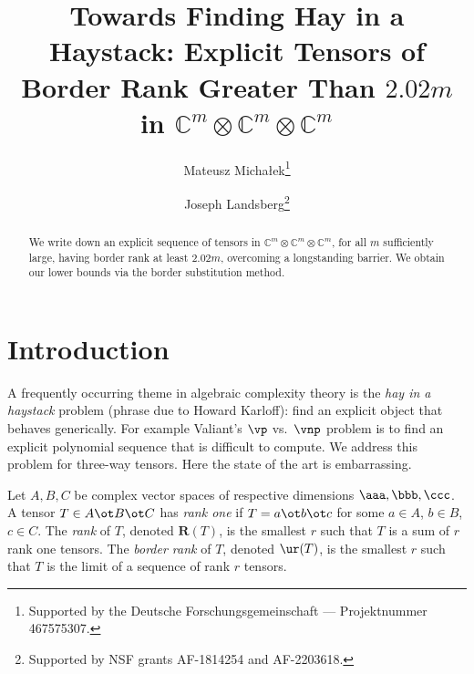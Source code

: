 \documentclass{toc}
\begin{document}
\begin{frontmatter}%

%
%
%

%
\title{Towards Finding Hay in a Haystack: Explicit Tensors of Border Rank Greater Than $2.02m$
in $\mathbb{C}^m\otimes \mathbb{C}^m\otimes \mathbb{C}^m$}  %

%
%

%
%
%
%
%
%

%
%
%
%
%
%
%
%
%
%
%
%


%
%
%
%

%

%
\author[michalek]{Mateusz Micha{\l}ek\thanks{Supported %
by the Deutsche Forschungsgemeinschaft — Projektnummer 467575307.}}
\author[landsberg]{Joseph Landsberg\thanks{Supported by NSF grants  AF-1814254 and AF-2203618.}}

%
%
%
%

%
%
%
%
%
%
%
%
\begin{abstract}
  We write down an explicit sequence of tensors in $\mathbb{C}^m\otimes \mathbb{C}^m\otimes \mathbb{C}^m$, for all $m$ sufficiently large, having border rank
  at least $2.02m$, overcoming a longstanding barrier. We obtain our lower bounds
via the border substitution method.
\end{abstract}

%

\end{frontmatter}

%
%
%
\section{Introduction}
A frequently occurring theme in algebraic complexity theory is the \emph{hay in a haystack}
problem (phrase due to %
Howard Karloff):
find an explicit object that behaves generically. For example Valiant's $\vp$ vs.~$\vnp$
problem is to find an explicit polynomial sequence that is difficult to compute.
We address this problem for three-way tensors. Here the state of the art is embarrassing.


Let $A,B,C$ be complex vector spaces %
of respective  %
dimensions $\aaa,\bbb,\ccc$. A tensor $T\in  A \ot B\ot C$ has \emph{rank one} if $T=a\ot b\ot c$ for some 
$a\in A$, $b\in B$, $c\in C$. The \emph{rank} of $T$, denoted $\mathbf R(T)$, is the 
smallest $r$ such that $T$ is a sum of $r$ rank one tensors.
 The \emph{border 
rank} of $T$, denoted $\ur(T)$, is the smallest $r$ such that $T$ is the limit of a 
sequence of rank $r$ tensors. 
\end{document}
